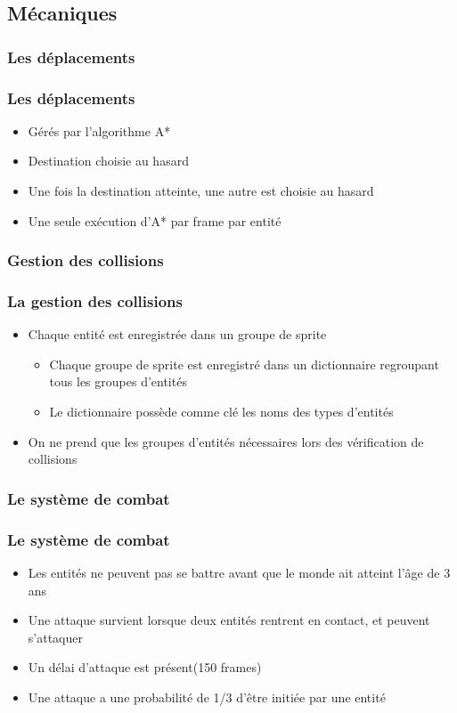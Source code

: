 \documentclass{beamer}
\begin{document}
\subsection{Mécaniques}
\subsubsection{Les déplacements}

\begin{frame} \frametitle{Les déplacements}
	\begin{itemize}
		\item Gérés par l'algorithme A*
		\item Destination choisie au hasard
		\item Une fois la destination atteinte, une autre est choisie au hasard
		\item Une seule exécution d'A* par frame par entité
	\end{itemize}
\end{frame}

\subsubsection{Gestion des collisions}

\begin{frame} \frametitle{La gestion des collisions}
	\begin{itemize}
		\item Chaque entité est enregistrée dans un groupe de sprite
		\begin{itemize}
			\item Chaque groupe de sprite est enregistré dans un dictionnaire regroupant tous les groupes d'entités
			\item Le dictionnaire possède comme clé les noms des types d'entités
		\end{itemize}
		\item On ne prend que les groupes d'entités nécessaires lors des vérification de collisions
	\end{itemize}
\end{frame}

\subsubsection{Le système de combat}

\begin{frame} \frametitle{Le système de combat}
	\begin{itemize}
		\item Les entités ne peuvent pas se battre avant que le monde ait atteint l'âge de 3 ans
		\item Une attaque survient lorsque deux entités rentrent en contact, et peuvent s'attaquer
		\item Un délai d'attaque est présent(150 frames)
		\item Une attaque a une probabilité de 1/3 d'être initiée par une entité
	\end{itemize}
\end{frame}
\end{document}
